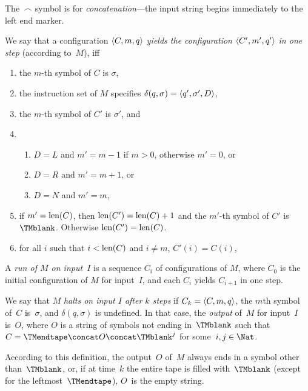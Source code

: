 \documentclass[../../../include/open-logic-section]{subfiles}
\begin{document}
\begin{explain}
The~$\frown$ symbol is for \emph{concatenation}---the input string
begins immediately to the left end marker.
\end{explain}

\begin{defn}
We say that a configuration $\langle C, m, q \rangle$ \emph{yields the
configuration $\langle C', m', q' \rangle$ in one step} (according to~$M$),
iff
\begin{enumerate}
\item the $m$-th symbol of $C$ is $\sigma$,
\item the instruction set of $M$ specifies $\delta(q, \sigma) =
  \langle q', \sigma', D \rangle$,
\item the $m$-th symbol of $C'$ is $\sigma'$, and 
\item
\begin{enumerate}
\item $D = L$ and $m' = m - 1$ if $m>0$, otherwise $m'=0$, or
\item $D = R$ and $m' = m + 1$, or
\item $D = N$ and $m' = m$,
\end{enumerate}
\item if $m' = \mathrm{len}(C)$, then $\mathrm{len}(C') = \mathrm{len}(C) + 1$ and the $m'$-th
  symbol of $C'$ is~$\TMblank$. Otherwise $\mathrm{len}(C')=\mathrm{len}(C)$.
\item for all $i$ such that $i < \mathrm{len}(C)$ and $i \neq m$, $C'(i) = C(i)$,
\end{enumerate}
\end{defn}

\begin{defn}
A \emph{run of $M$ on input~$I$} is a sequence $C_i$ of configurations
of $M$, where $C_0$ is the initial configuration of $M$ for input~$I$,
and each $C_i$ yields $C_{i+1}$ in one step.

We say that $M$ \emph{halts on input $I$ after $k$ steps} if $C_k =
\langle C, m, q \rangle$, the $m$th symbol of~$C$ is~$\sigma$, and $\delta(q,
\sigma)$ is undefined.  In that case, the \emph{output} of~$M$ for
input~$I$ is~$O$, where $O$ is a string of symbols not ending
in~$\TMblank$ such that $C = \TMendtape \concat O \concat \TMblank^j$
for some~$i, j \in \Nat$.
\end{defn}

\begin{explain}
According to this definition, the output~$O$ of~$M$ always 
ends in a symbol other than~$\TMblank$, or, if at time~$k$ the entire
tape is filled with~$\TMblank$ (except for the leftmost~$\TMendtape$),
$O$~is the empty string.
\end{explain}
\end{document}
